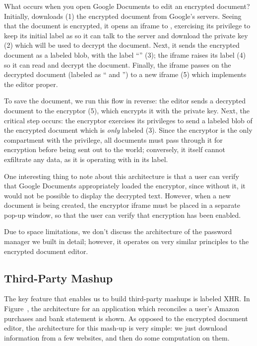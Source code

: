 What occurs when you open Google Documents to edit an encrypted
document?
%
Initially,  downloads (1) the encrypted document from
Google's servers.
%
Seeing that the document is encrypted, it opens an iframe to
, exercising its privilege to keep its initial label as
 so it can talk to the  server and
download the private key (2) which will be used to decrypt the document.
%
Next, it sends the encrypted document as a labeled blob, with the label
``'' (3); the iframe raises its label (4) so it can read
and decrypt the document.
%
Finally, the iframe passes on the decrypted document (labeled as
`` and '') to a new iframe (5) which
implements the editor proper.

To save the document, we run this flow in reverse: the editor sends a
decrypted document to the encryptor (5), which encrypts it with the
private key.  Next, the critical step occurs: the encryptor exercises its privileges
to send a labeled blob of the encrypted document which is \emph{only}
labeled  (3).  Since the encryptor is the only compartment
with the  privilege, all documents must pass through it for
encryption before being sent out to the world; conversely, it itself cannot
exfiltrate any data, as it is operating with  in its label.

One interesting thing to note about this architecture is that a user can
verify that Google Documents appropriately loaded the encryptor, since
without it, it would not be possible to display the decrypted text.  However, when
a new document is being created, the encryptor iframe must be placed
in a separate pop-up window, so that the user can verify that encryption
has been enabled.

Due to space limitations, we don't discuss the architecture of the
password manager we built in detail; however, it operates on very
similar principles to the encrypted document editor.

\subsection{Third-Party Mashup}
\label{sec:apps-mashup}

The key feature that enables us to build third-party mashups is
labeled XHR\@.  In Figure~, the architecture for an
application which reconciles a user's Amazon purchases
and bank statement is shown.  As opposed to the encrypted document editor,
the architecture for this mash-up is very simple: we just download
information from a few websites, and then do some computation on them.

